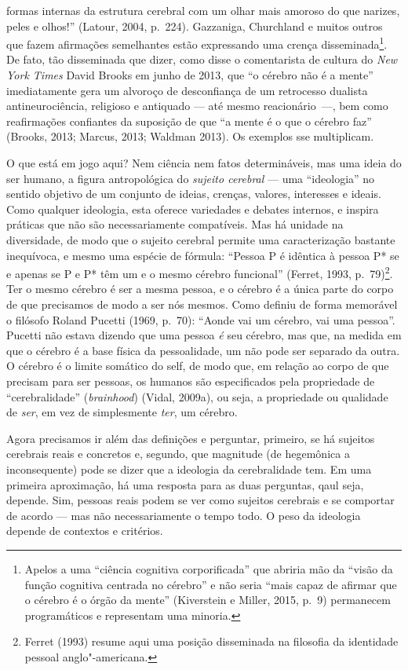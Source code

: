 formas internas da estrutura cerebral com um olhar mais amoroso do que
narizes, peles e olhos!'' (Latour, 2004, p.~224). Gazzaniga, Churchland e
muitos outros que fazem afirmações semelhantes estão expressando uma
crença disseminada\footnote[2]{Apelos a uma ``ciência cognitiva corporificada'' que abriria mão da
``visão da função cognitiva centrada no cérebro'' e não seria ``mais
capaz de afirmar que o cérebro é o órgão da mente'' (Kiverstein e
Miller, 2015, p.~9) permanecem programáticos e representam uma minoria.}. De fato, tão disseminada que
dizer, como disse o comentarista de cultura do \emph{New York Times}
David Brooks em junho de 2013, que ``o cérebro não é a mente''
imediatamente gera um alvoroço de desconfiança de um retrocesso dualista
antineurociência, religioso e antiquado --- até mesmo reacionário~---,
bem como reafirmações confiantes da suposição de que ``a mente é o que o
cérebro faz'' (Brooks, 2013; Marcus, 2013; Waldman 2013). Os exemplos
sse multiplicam.

O que está em jogo aqui? Nem ciência nem fatos determináveis, mas uma
ideia do ser humano, a figura antropológica do \emph{sujeito cerebral}
--- uma ``ideologia'' no sentido objetivo de um conjunto de ideias,
crenças, valores, interesses e ideais. Como qualquer ideologia, esta
oferece variedades e debates internos, e inspira práticas que não são
necessariamente compatíveis. Mas há unidade na diversidade, de modo que
o sujeito cerebral permite uma caracterização bastante inequívoca, e
mesmo uma espécie de fórmula: ``Pessoa P é idêntica à pessoa P* se e
apenas se P e P* têm um e o mesmo cérebro funcional'' (Ferret, 1993,
p.~79)\footnote[3]{Ferret (1993) resume aqui uma posição disseminada na filosofia da
identidade pessoal anglo"-americana.}. Ter o mesmo cérebro é ser a mesma pessoa, e o
cérebro é a única parte do corpo de que precisamos de modo a ser nós
mesmos. Como definiu de forma memorável o filósofo Roland Pucetti (1969,
p.~70): ``Aonde vai um cérebro, vai uma pessoa''. Pucetti não estava
dizendo que uma pessoa \emph{é} seu cérebro, mas que, na medida em que o
cérebro é a base física da pessoalidade, um não pode ser separado da
outra. O cérebro é o limite somático do self, de modo que, em relação ao
corpo de que precisam para ser pessoas, os humanos são especificados
pela propriedade de ``cerebralidade'' (\emph{brainhood}) (Vidal, 2009a),
ou seja, a propriedade ou qualidade de \emph{ser}, em vez de
simplesmente \emph{ter}, um cérebro.

Agora precisamos ir além das definições e perguntar, primeiro, se há
sujeitos cerebrais reais e concretos e, segundo, que magnitude (de
hegemônica a inconsequente) pode se dizer que a ideologia da
cerebralidade tem. Em uma primeira aproximação, há uma resposta para as
duas perguntas, qaul seja, depende. Sim, pessoas reais podem se ver como
sujeitos cerebrais e se comportar de acordo --- mas não necessariamente
o tempo todo. O peso da ideologia depende de contextos e critérios.


